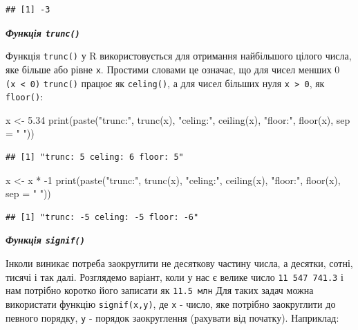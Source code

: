 \documentclass[
]{book}
\newenvironment{Shaded}{\begin{snugshade}}{\end{snugshade}}
\newcommand{\AttributeTok}[1]{\textcolor[rgb]{0.77,0.63,0.00}{#1}}
\newcommand{\DecValTok}[1]{\textcolor[rgb]{0.00,0.00,0.81}{#1}}
\newcommand{\FloatTok}[1]{\textcolor[rgb]{0.00,0.00,0.81}{#1}}
\newcommand{\FunctionTok}[1]{\textcolor[rgb]{0.00,0.00,0.00}{#1}}
\newcommand{\NormalTok}[1]{#1}
\newcommand{\OtherTok}[1]{\textcolor[rgb]{0.56,0.35,0.01}{#1}}
\newcommand{\SpecialCharTok}[1]{\textcolor[rgb]{0.00,0.00,0.00}{#1}}
\newcommand{\StringTok}[1]{\textcolor[rgb]{0.31,0.60,0.02}{#1}}
\begin{document}
\begin{verbatim}
## [1] -3
\end{verbatim}

\emph{\textbf{Функція \texttt{trunc()}}}

Функція \texttt{trunc()} у R використовується для отримання найбільшого цілого числа, яке більше або рівне \texttt{x}. Простими словами це означає, що для чисел менших 0 \texttt{(x\ \textless{}\ 0)} \texttt{trunc()} працює як \texttt{celing()}, а для чисел більших нуля \texttt{x\ \textgreater{}\ 0}, як \texttt{floor()}:

\begin{Shaded}
\begin{Highlighting}[]
\NormalTok{x }\OtherTok{\textless{}{-}} \FloatTok{5.34}
\FunctionTok{print}\NormalTok{(}\FunctionTok{paste}\NormalTok{(}\StringTok{"trunc:"}\NormalTok{, }\FunctionTok{trunc}\NormalTok{(x), }\StringTok{"celing:"}\NormalTok{, }\FunctionTok{ceiling}\NormalTok{(x), }\StringTok{"floor:"}\NormalTok{, }\FunctionTok{floor}\NormalTok{(x), }\AttributeTok{sep =} \StringTok{" "}\NormalTok{))}
\end{Highlighting}
\end{Shaded}

\begin{verbatim}
## [1] "trunc: 5 celing: 6 floor: 5"
\end{verbatim}

\begin{Shaded}
\begin{Highlighting}[]
\NormalTok{x }\OtherTok{\textless{}{-}}\NormalTok{ x }\SpecialCharTok{*} \SpecialCharTok{{-}}\DecValTok{1}
\FunctionTok{print}\NormalTok{(}\FunctionTok{paste}\NormalTok{(}\StringTok{"trunc:"}\NormalTok{, }\FunctionTok{trunc}\NormalTok{(x), }\StringTok{"celing:"}\NormalTok{, }\FunctionTok{ceiling}\NormalTok{(x), }\StringTok{"floor:"}\NormalTok{, }\FunctionTok{floor}\NormalTok{(x), }\AttributeTok{sep =} \StringTok{" "}\NormalTok{))}
\end{Highlighting}
\end{Shaded}

\begin{verbatim}
## [1] "trunc: -5 celing: -5 floor: -6"
\end{verbatim}

\emph{\textbf{Функція \texttt{signif()}}}

Інколи виникає потреба заокруглити не десяткову частину числа, а десятки, сотні, тисячі і так далі. Розглядемо варіант, коли у нас є велике число \texttt{11\ 547\ 741.3} і нам потрібно коротко його записати як \texttt{11.5\ млн} Для таких задач можна використати функцію \texttt{signif(x,y)}, де \texttt{x} - число, яке потрібно заокруглити до певного порядку, \texttt{y} - порядок заокруглення (рахувати від початку). Наприклад:
\end{document}
